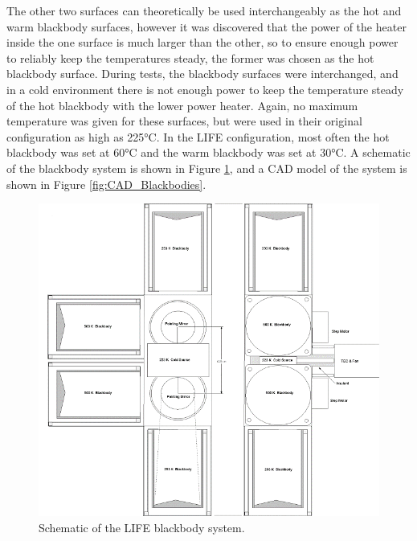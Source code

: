 The other two surfaces can theoretically be used interchangeably as the hot and warm blackbody surfaces, however it was discovered that the power of the heater inside the one surface is much larger than the other, so to ensure enough power to reliably keep the temperatures steady, the former was chosen as the hot blackbody surface. During tests, the blackbody surfaces were interchanged, and in a cold environment there is not enough power to keep the temperature steady of the hot blackbody with the lower power heater. Again, no maximum temperature was given for these surfaces, but were used in their original configuration as high as 225°C. In the LIFE configuration, most often the hot blackbody was set at 60°C and the warm blackbody was set at 30°C. A schematic of the blackbody system is shown in Figure \ref{fig:bb_schematic}, and a CAD model of the system is shown in Figure \ref{fig:CAD_Blackbodies}.

\begin{figure}
    \centering
    \includegraphics{chap3_images/Blackbody_schematic.png}
    \caption{Schematic of the LIFE blackbody system.}
    \label{fig:bb_schematic}
\end{figure}

